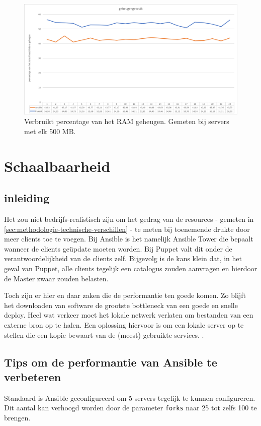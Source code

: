 \begin{figure}
  \includegraphics[width=\linewidth]{img/geheugengebruik}
 \caption{Verbruikt percentage van het RAM geheugen. Gemeten bij servers met elk 500 MB. }  
  \label{fig:geheugengebruik}
\end{figure}


\section{Schaalbaarheid}
\label{sec:schaalbaarheid}

\subsection{inleiding}
\label{sec:inleiding}

Het zou niet bedrijfs-realistisch zijn om het gedrag van de resources  - gemeten in \ref{sec:methodologie-technische-verschillen} - te meten bij toenemende drukte door meer clients toe te voegen. Bij Ansible is het namelijk Ansible Tower die bepaalt wanneer de clients ge\"update moeten worden. Bij Puppet valt dit onder de verantwoordelijkheid van de clients zelf. Bijgevolg is de kans klein dat, in het geval van Puppet, alle clients tegelijk een catalogus zouden aanvragen en hierdoor de Master zwaar zouden belasten.

 Toch zijn er hier en daar zaken die de performantie ten goede komen. Zo blijft het downloaden van software de grootste bottleneck van een goede en snelle deploy. Heel wat verkeer moet het lokale netwerk verlaten om bestanden van een externe bron op te halen. Een oplossing hiervoor is om een lokale server op te stellen die een kopie bewaart van de (meest) gebruikte services. \autocite{AnsibleTuning}.
 
 \subsection{Tips om de performantie van Ansible te verbeteren}
 Standaard is Ansible geconfigureerd om 5 servers tegelijk te kunnen configureren. Dit aantal kan verhoogd worden door de parameter \texttt{\gls{fork}s} naar 25 tot zelfs 100 te brengen. 
 
